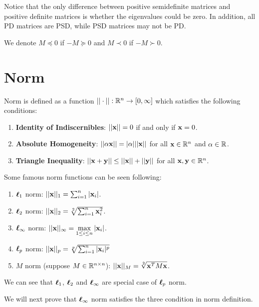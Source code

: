 \documentclass[../main.tex]{subfiles}
\begin{document}
Notice that the only difference between positive semidefinite matrices and positive definite matrices is whether the eigenvalues could be zero. In addition, all PD matrices are PSD, while PSD matrices may not be PD.

\begin{notation}
	We denote $M \preceq 0$ if $-M \succeq 0$ and $M \prec 0$ if $-M \succ 0$.
\end{notation}


\section{Norm}

\begin{definition}
	Norm is defined as a function $||\cdot||: \mathbb{R}^n \to [0, \infty]$ which satisfies the following conditions:
	
	\begin{enumerate}
		\item \textbf{Identity of Indiscernibles}: $||\mathbf{x}|| = 0$ if and only if $\mathbf{x} = 0$.
		\item \textbf{Absolute Homogeneity}: $||\alpha \mathbf{x}|| = |\alpha| ||\mathbf{x}||$ for all $\mathbf{x} \in \mathbb{R}^n$ and $\alpha \in \mathbb{R}$.
		\item \textbf{Triangle Inequality}: $||\mathbf{x} + \mathbf{y}|| \leq ||\mathbf{x}|| + ||\mathbf{y}||$ for all $\mathbf{x}, \mathbf{y} \in \mathbb{R}^n$.  
	\end{enumerate} 
\end{definition}

Some famous norm functions can be seen following:

\begin{enumerate}
	\item $\boldsymbol{\ell}_1$ norm: $||\mathbf{x}||_1 = \sum_{i=1}^{n} |\mathbf{x}_i|$.
	\item $\boldsymbol{\ell}_2$ norm: $||\mathbf{x}||_2 = \sqrt[2]{\sum_{i=1}^n \mathbf{x}_i^2}$.
	\item $\boldsymbol{\ell}_{\infty}$ norm: $||\mathbf{x}||_{\infty} = \max\limits_{1 \leq i \leq n} |\mathbf{x}_i|$.
	\item $\boldsymbol{\ell}_p$ norm: $||\mathbf{x}||_p = \sqrt[p]{\sum_{i=1}^n |\mathbf{x}_i|^p}$
	\item $M$ norm (suppose $M \in \mathbb{R}^{n\times n}$): $||\mathbf{x}||_M = \sqrt[2]{\mathbf{x}^T M \mathbf{x}}$.
\end{enumerate}

We can see that $\boldsymbol{\ell}_1$, $\boldsymbol{\ell}_2$ and $\boldsymbol{\ell}_{\infty}$ are special case of $\boldsymbol{\ell}_p$ norm.

We will next prove that $\boldsymbol{\ell}_{\infty}$ norm satisfies the three condition in norm definition.
\end{document}
